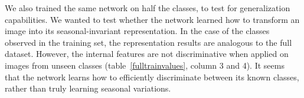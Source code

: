 We also trained the same network on half the classes, to test for generalization capabilities. We wanted to test whether the network learned how to transform an image into its seasonal-invariant representation. %
In the case of the classes observed in the training set, the representation results are analogous to the full dataset. However, the internal features are not discriminative when applied on images from unseen classes (table~\ref{fulltrainvalues}, column 3 and 4). It seems that the network learns how to efficiently discriminate between its known classes, rather than truly learning seasonal variations.

